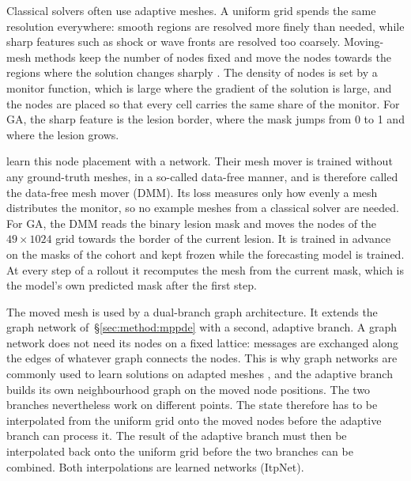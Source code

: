 Classical solvers often use adaptive meshes. A uniform grid spends the
same resolution everywhere: smooth regions are resolved more finely than
needed, while sharp features such as shock or wave fronts are resolved too
coarsely. Moving-mesh methods keep the number of nodes fixed and move the
nodes towards the regions where the solution changes sharply
\citep{HuangRussell2011}. The density of nodes is set by a monitor
function, which is large where the gradient of the solution is large, and
the nodes are placed so that every cell carries the same share of the
monitor. For GA, the sharp feature is the lesion border, where the mask
jumps from 0 to 1 and where the lesion grows.

\citet{Hu2024} learn this node placement with a network. Their mesh mover
is trained without any ground-truth meshes, in a so-called data-free
manner, and is therefore called the data-free mesh mover (DMM). Its loss
measures only how evenly a mesh distributes the monitor, so no example
meshes from a classical solver are needed. For GA, the DMM reads the binary
lesion mask and moves the nodes of the $49 \times 1024$ grid towards the
border of the current lesion. It is trained in advance on the masks of the
cohort and kept frozen while the forecasting model is trained. At every
step of a rollout it recomputes the mesh from the current mask, which is
the model's own predicted mask after the first step.

The moved mesh is used by a dual-branch graph architecture. It extends the
graph network of~\S\ref{sec:method:mppde} with a second, adaptive branch.
A graph network does not need its nodes on a fixed lattice: messages are
exchanged along the edges of whatever graph connects the nodes. This is why
graph networks are commonly used to learn solutions on adapted meshes
\citep{Pfaff2021, Hu2024}, and the adaptive branch builds its own
neighbourhood graph on the moved node positions. The two branches
nevertheless work on different points. The state therefore has to be
interpolated from the uniform grid onto the moved nodes before the
adaptive branch can process it. The result of the adaptive branch must
then be interpolated back onto the uniform grid before the two branches
can be combined. Both interpolations are learned networks (ItpNet).

